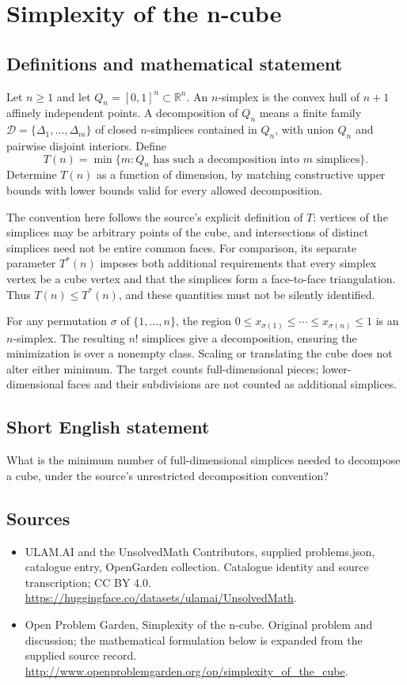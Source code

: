 \documentclass[11pt,a4paper]{article}
\begin{document}
\section*{Simplexity of the n-cube}\label{statement}

\subsection{Definitions and mathematical statement}
Let $n\ge1$ and let $Q_n=[0,1]^n\subset\mathbb R^n$.
An $n$-simplex is the convex hull of $n+1$ affinely independent points.
A decomposition of $Q_n$ means a finite family
$\mathcal D=\{\Delta_1,\ldots,\Delta_m\}$ of closed $n$-simplices
contained in $Q_n$, with union $Q_n$ and pairwise disjoint interiors.
Define
\[
 T(n)=\min\{m:Q_n\text{ has such a decomposition into }m\text{ simplices}\}.
\]
Determine $T(n)$ as a function of dimension, by matching constructive
upper bounds with lower bounds valid for every allowed decomposition.

The convention here follows the source's explicit definition of $T$:
vertices of the simplices may be arbitrary points of the cube, and
intersections of distinct simplices need not be entire common faces.
For comparison, its separate parameter $T^*(n)$ imposes both additional
requirements that every simplex vertex be a cube vertex and that the
simplices form a face-to-face triangulation. Thus $T(n)\le T^*(n)$, and
these quantities must not be silently identified.

For any permutation $\sigma$ of $\{1,\ldots,n\}$, the region
$0\le x_{\sigma(1)}\le\cdots\le x_{\sigma(n)}\le1$ is an $n$-simplex.
The resulting $n!$ simplices give a decomposition, ensuring the minimization
is over a nonempty class. Scaling or translating the cube does not
alter either minimum. The target counts full-dimensional pieces; lower-dimensional
faces and their subdivisions are not counted as additional simplices.
\subsection{Short English statement}
What is the minimum number of full-dimensional simplices needed to decompose a cube, under the source’s unrestricted decomposition convention?
\subsection{Sources}
\begin{itemize}
\item[S1] ULAM.AI and the UnsolvedMath Contributors, supplied problems.json, catalogue entry, OpenGarden collection. Catalogue identity and source transcription; CC BY 4.0.
\url{https://huggingface.co/datasets/ulamai/UnsolvedMath}.
\item[S2] Open Problem Garden, Simplexity of the n-cube. Original problem and discussion; the mathematical formulation below is expanded from the supplied source record.
\url{http://www.openproblemgarden.org/op/simplexity_of_the_cube}.
\end{itemize}
\end{document}
